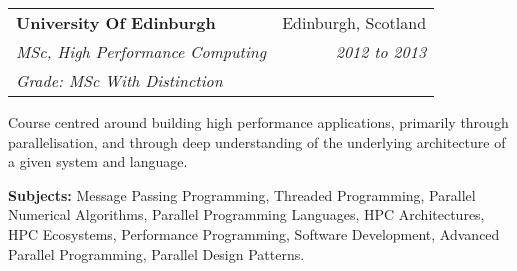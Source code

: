 \documentclass[11pt]{article}
\makeatletter
\newenvironment{resumeSubSectionHeader}{
    \par
    \begin{tabular*}{\textwidth}{l@{\extracolsep{\fill}}r}
    \par
} {
    \end{tabular*}
    \par
}
\newenvironment{resumeSubSectionBody}{
    \par
    \vspace{-0.8\parskip}
    \begin{small}
    \par
} {
    \par
    \end{small}
    \par
}
\makeatother
\begin{document}
%
%
\begin{resumeSubSectionHeader}

    \textbf{University Of Edinburgh}       & Edinburgh, Scotland \\
    \emph{MSc, High Performance Computing} & \emph{2012 to 2013} \\
    \emph{Grade: MSc With Distinction}

\end{resumeSubSectionHeader}
\begin{resumeSubSectionBody}

    Course centred around building high performance applications,
    primarily through parallelisation, and through deep understanding
    of the underlying architecture of a given system and language.

    \begin{description}
        \item{\bf Subjects:}
            Message Passing Programming, Threaded Programming,
            Parallel Numerical Algorithms,
            Parallel Programming Languages, HPC Architectures,
            HPC Ecosystems, Performance Programming,
            Software Development, Advanced Parallel Programming,
            Parallel Design Patterns.
    \end{description}

\end{resumeSubSectionBody}
\end{document}
